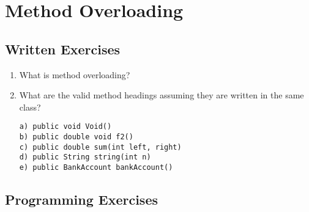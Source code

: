 \section{Method Overloading}

\subsection{Written Exercises}

\setcounter{counter}{1}
\begin{enumerate}[label={\arabic{counter}\addtocounter{counter}{1}}.]

\item What is method overloading? 

\item What are the valid method headings assuming they are written in the same class?
\begin{lstlisting}
a) public void Void()
b) public double void f2()
c) public double sum(int left, right)
d) public String string(int n)
e) public BankAccount bankAccount()
\end{lstlisting}

\end{enumerate}

\subsection{Programming Exercises}